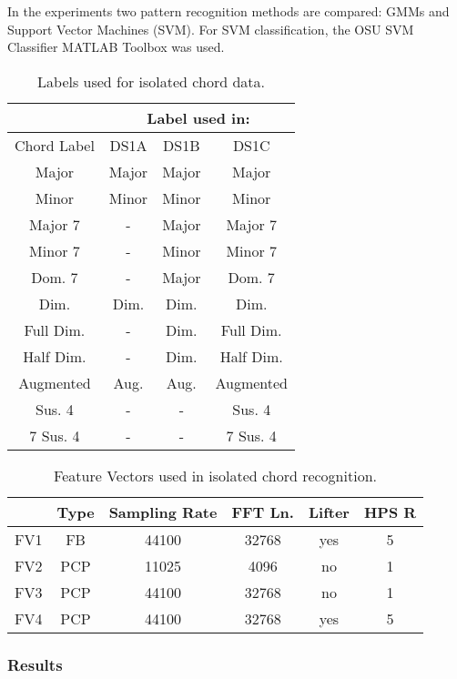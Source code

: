 \documentclass{sig-alternate}
\begin{document}
In the experiments two pattern recognition methods are compared: GMMs and Support Vector Machines (SVM). For SVM classification, the OSU SVM Classifier MATLAB Toolbox was used. 


\begin{table}
\centering
\begin{tabular}{|c|c|c|c|} \hline
&\multicolumn{3}{|c|}{Label used in:} \\ \hline
Chord Label & DS1A & DS1B & DS1C \\ \hline
Major & Major & Major & Major \\ \hline
Minor & Minor & Minor & Minor \\ \hline
Major 7 & - & Major & Major 7 \\ \hline
Minor 7 & - & Minor & Minor 7 \\ \hline
Dom. 7 & - & Major & Dom. 7 \\ \hline
Dim. & Dim. & Dim. & Dim. \\ \hline
Full Dim. & - & Dim. & Full Dim. \\ \hline
Half Dim. & - & Dim. & Half Dim. \\ \hline
Augmented & Aug. & Aug. & Augmented \\ \hline
Sus. 4 & - & - & Sus. 4 \\ \hline
7 Sus. 4 & - & - & 7 Sus. 4 \\ \hline
\end{tabular}
\caption{Labels used for isolated chord data.}
\label{tab:tab1}
\end{table} 

\begin{table}
\centering
\begin{tabular}{|c|c|c|c|c|c|} \hline
 & Type & Sampling Rate & FFT Ln. & Lifter & HPS R \\ \hline
FV1 & FB & 44100 & 32768 & yes & 5 \\ \hline
FV2 & PCP & 11025 & 4096 & no & 1 \\ \hline
FV3 & PCP & 44100 & 32768 & no & 1 \\ \hline
FV4 & PCP & 44100 & 32768 & yes & 5 \\ \hline
\end{tabular}
\caption{Feature Vectors used in isolated chord recognition.}
\label{tab:tab2}
\end{table} 

\subsubsection{Results}
\end{document}

